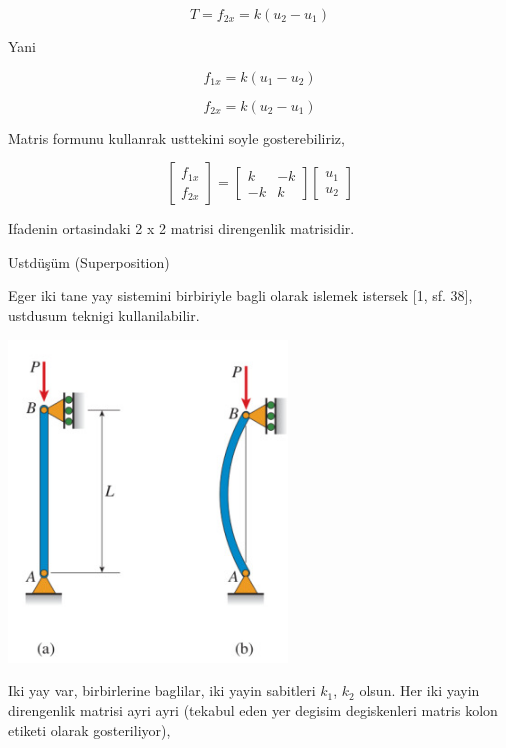 \documentclass[12pt,fleqn]{article}\usepackage{../../common}
\begin{document}
$$
T = f_{2x} = k (u_2 - u_1)
$$

Yani

$$
f_{1x} = k(u_1 - u_2)
$$

$$
f_{2x} = k(u_2 - u_1)
$$

Matris formunu kullanrak usttekini soyle gosterebiliriz,

$$
\left[\begin{array}{ccc}
f_{1x} \\ f_{2x}
\end{array}\right] = 
\left[\begin{array}{ccc}
k & -k \\ -k & k
\end{array}\right]
\left[\begin{array}{ccc}
u_1 \\ u_2
\end{array}\right]
$$

Ifadenin ortasindaki 2 x 2 matrisi direngenlik matrisidir.

Ustdüşüm (Superposition)

Eger iki tane yay sistemini birbiriyle bagli olarak islemek istersek [1, sf. 38],
ustdusum teknigi kullanilabilir.

\includegraphics[width=20em]{phy_020_strs_06_02.jpg}

Iki yay var, birbirlerine baglilar, iki yayin sabitleri $k_1$, $k_2$
olsun. Her iki yayin direngenlik matrisi ayri ayri (tekabul eden yer degisim
degiskenleri matris kolon etiketi olarak gosteriliyor),
\end{document}
